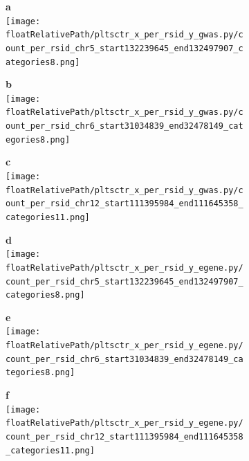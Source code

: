 \begin{figure}[!ht]

\begin{subfigure}[]{.33\textwidth}
\textbf{a}
\\
\texttt{[image: \\floatRelativePath/pltsctr\_x\_per\_rsid\_y\_gwas.py/count\_per\_rsid\_chr5\_start132239645\_end132497907\_categories8.png]}
\end{subfigure}
%
\begin{subfigure}[]{.33\textwidth}
\textbf{b}
\\
\texttt{[image: \\floatRelativePath/pltsctr\_x\_per\_rsid\_y\_gwas.py/count\_per\_rsid\_chr6\_start31034839\_end32478149\_categories8.png]}
\end{subfigure}
%
\begin{subfigure}[]{.33\textwidth}
\textbf{c}
\\
\texttt{[image: \\floatRelativePath/pltsctr\_x\_per\_rsid\_y\_gwas.py/count\_per\_rsid\_chr12\_start111395984\_end111645358\_categories11.png]}
\end{subfigure}


\begin{subfigure}[]{.33\textwidth}
\textbf{d}
\\
\texttt{[image: \\floatRelativePath/pltsctr\_x\_per\_rsid\_y\_egene.py/count\_per\_rsid\_chr5\_start132239645\_end132497907\_categories8.png]}
\end{subfigure}
%
\begin{subfigure}[]{.33\textwidth}
\textbf{e}
\\
\texttt{[image: \\floatRelativePath/pltsctr\_x\_per\_rsid\_y\_egene.py/count\_per\_rsid\_chr6\_start31034839\_end32478149\_categories8.png]}
\end{subfigure}
%
\begin{subfigure}[]{.33\textwidth}
\textbf{f}
\\
\texttt{[image: \\floatRelativePath/pltsctr\_x\_per\_rsid\_y\_egene.py/count\_per\_rsid\_chr12\_start111395984\_end111645358\_categories11.png]}
\end{subfigure}


\end{figure}
